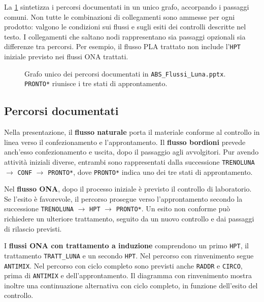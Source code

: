 La \cref{fig:documented-production-graph} sintetizza i percorsi documentati in un unico grafo, accorpando i passaggi comuni. Non tutte le combinazioni di collegamenti sono ammesse per ogni prodotto: valgono le condizioni sui flussi e sugli esiti dei controlli descritte nel testo. I collegamenti che saltano nodi rappresentano sia passaggi opzionali sia differenze tra percorsi. Per esempio, il flusso PLA trattato non include l'\texttt{HPT} iniziale previsto nei flussi ONA trattati.

\begin{figure}
\centering
\resizebox{0.93\linewidth}{!}{}
\caption{Grafo unico dei percorsi documentati in \texttt{ABS\_Flussi\_Luna.pptx}. \texttt{PRONTO*} riunisce i tre stati di approntamento.}
\label{fig:documented-production-graph}
\end{figure}

\subsection{Percorsi documentati}

Nella presentazione, il \textbf{flusso naturale} porta il materiale conforme al controllo in linea verso il confezionamento e l'approntamento. Il \textbf{flusso bordioni} prevede anch'esso confezionamento e uscita, dopo il passaggio agli avvolgitori. Pur avendo attività iniziali diverse, entrambi sono rappresentati dalla successione \texttt{TRENOLUNA} $\rightarrow$ \texttt{CONF} $\rightarrow$ \texttt{PRONTO*}, dove \texttt{PRONTO*} indica uno dei tre stati di approntamento.

Nel \textbf{flusso ONA}, dopo il processo iniziale è previsto il controllo di laboratorio. Se l'esito è favorevole, il percorso prosegue verso l'approntamento secondo la successione \texttt{TRENOLUNA} $\rightarrow$ \texttt{HPT} $\rightarrow$ \texttt{PRONTO*}. Un esito non conforme può richiedere un ulteriore trattamento, seguito da un nuovo controllo e dai passaggi di rilascio previsti.

I \textbf{flussi ONA con trattamento a induzione} comprendono un primo \texttt{HPT}, il trattamento \texttt{TRATT\_LUNA} e un secondo \texttt{HPT}. Nel percorso con rinvenimento segue \texttt{ANTIMIX}. Nel percorso con ciclo completo sono previsti anche \texttt{RADDR} e \texttt{CIRCO}, prima di \texttt{ANTIMIX} e dell'approntamento. Il diagramma con rinvenimento mostra inoltre una continuazione alternativa con ciclo completo, in funzione dell'esito del controllo.

